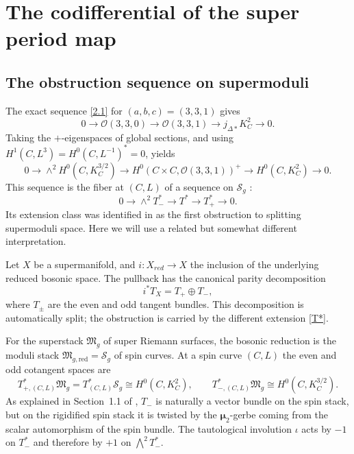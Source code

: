 \documentclass[10pt,a4paper]{amsart}
\newcommand{\OO}{\mathcal O}
\newcommand{\FM}{\mathfrak M}
\newcommand{\SSS}{\mathcal S}
\begin{document}
\section{The codifferential of the super period map}

\subsection{The obstruction sequence on supermoduli}

The exact sequence \eqref{2.1} for $(a,b,c)=(3,3,1)$ gives
\[
{0\to \OO(3,3,0) \to \OO(3,3,1) \to j_{\Delta*}K_C^2 \to 0.}
\]
{Taking the $+$-eigenspaces of global sections, and using
$H^1(C,L^3)=H^0(C,L^{-1})^*=0$, yields}
\begin{equation} \label{obstruction}
0\to \wedge^2 H^0(C,K_C^{3/2})
\to {H^0(C\times C,\OO(3,3,1))^+}
\to H^0(C,K_C^2)\to 0.
\end{equation}
This sequence is the fiber at $(C,L)$ of a sequence on $\SSS_g$ :
\begin{equation} \label{T*}
    0\to \wedge^2 T_-^* \to T^* \to T_+^* \to 0.
\end{equation}
Its extension class was identified in {\cite[Proposition~3.1 and Theorem~3.2]{DW2}} as
the first obstruction to splitting supermoduli space.
Here we will use a related but somewhat different interpretation.

Let $X$ be a supermanifold,
and $i:X_{red} \to X$ the inclusion of the underlying reduced bosonic space.
{The pullback has the canonical parity decomposition}
\begin{equation} \label{pm}
    {i^*T_X=T_+\oplus T_-,}
\end{equation}
where $T_{\pm}$ are the even and odd tangent bundles.
{This decomposition is automatically split; the obstruction is
carried by the different extension \eqref{T*}.}

For the superstack $\FM_g$ of super Riemann surfaces, the bosonic
reduction is the moduli stack $\FM_{g,\mathrm{red}}=\SSS_g$ of spin
curves.  At a spin curve $(C,L)$ the even and odd cotangent spaces are
\[
T^*_{+,(C,L)}\FM_g
=T^*_{(C,L)}\SSS_g
\cong H^0(C,K_C^2),
\qquad
T^*_{-,(C,L)}\FM_g
\cong H^0(C,K_C^{3/2}).
\]
As explained in Section~1.1 of \cite{DW2}, $T_-$ is naturally a vector
bundle on the spin stack, but on the {rigidified spin stack} it is twisted by
the $\boldsymbol\mu_2$-gerbe coming from the scalar automorphism of the spin
bundle.  The tautological involution $\iota$ acts by $-1$ on $T_-^*$ and
therefore by $+1$ on $\bigwedge^2T_-^*$.
\end{document}
